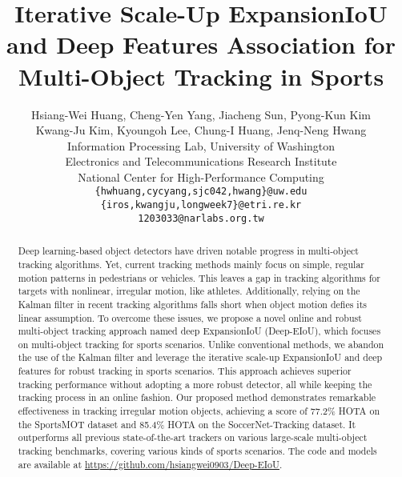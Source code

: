\documentclass[10pt,twocolumn,letterpaper]{article}
\begin{document}
\title{Iterative Scale-Up ExpansionIoU and Deep Features Association for Multi-Object Tracking in Sports}

\author{Hsiang-Wei Huang, Cheng-Yen Yang, Jiacheng Sun, Pyong-Kun Kim\\Kwang-Ju Kim, Kyoungoh Lee, Chung-I Huang, Jenq-Neng Hwang\\
Information Processing Lab, University of Washington\\
Electronics and Telecommunications Research Institute\\
National Center for High-Performance Computing\\
{\tt\small \{hwhuang,cycyang,sjc042,hwang\}@uw.edu}\\
{\tt\small \{iros,kwangju,longweek7\}@etri.re.kr}\\
\tt\small 1203033@narlabs.org.tw}


\maketitle
\thispagestyle{empty}

\begin{abstract}
Deep learning-based object detectors have driven notable progress in multi-object tracking algorithms. Yet, current tracking methods mainly focus on simple, regular motion patterns in pedestrians or vehicles. This leaves a gap in tracking algorithms for targets with nonlinear, irregular motion, like athletes. Additionally, relying on the Kalman filter in recent tracking algorithms falls short when object motion defies its linear assumption. To overcome these issues, we propose a novel online and robust multi-object tracking approach named deep ExpansionIoU (Deep-EIoU), which focuses on multi-object tracking for sports scenarios. Unlike conventional methods, we abandon the use of the Kalman filter and leverage the iterative scale-up ExpansionIoU and deep features for robust tracking in sports scenarios. This approach achieves superior tracking performance without adopting a more robust detector, all while keeping the tracking process in an online fashion. Our proposed method demonstrates remarkable effectiveness in tracking irregular motion objects, achieving a score of 77.2\% HOTA on the SportsMOT dataset and 85.4\% HOTA on the SoccerNet-Tracking dataset. It outperforms all previous state-of-the-art trackers on various large-scale multi-object tracking benchmarks, covering various kinds of sports scenarios. The code and models are available at \href{https://github.com/hsiangwei0903/Deep-EIoU}{https://github.com/hsiangwei0903/Deep-EIoU}.
\end{abstract}
\end{document}
